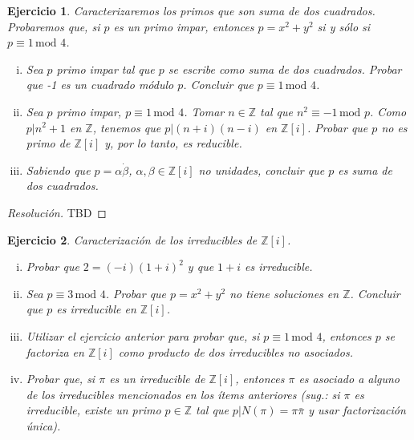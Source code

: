 \documentclass[a4paper,11pt]{article}
\newcommand{\Zm}[1]{\ensuremath{\mathbb{Z}[#1]}}
\newcommand{\Cong}[3]{\ensuremath{#1 \equiv #2 \, \textrm{mod } #3}}
\newcommand{\Div}[2]{\ensuremath{#1 | #2}}
\newtheorem*{ej}{Ejercicio}
\begin{document}
\begin{ej} 
Caracterizaremos los primos que son suma de dos cuadrados. Probaremos que, si $p$ es un
primo impar, entonces $p = x^2 + y^2$ si y sólo si $\Cong{p}{1}{4}$.

\begin{enumerate}[i.]
    \item Sea $p$ primo impar tal que $p$ se escribe como suma de dos cuadrados.
    Probar que -1 es un cuadrado módulo $p$. Concluir que $\Cong{p}{1}{4}$.

    \item Sea $p$ primo impar, $\Cong{p}{1}{4}$. Tomar $n \in \mathbb{Z}$ tal que
    $\Cong{n^2}{-1}{p}$. Como $\Div{p}{n^2 + 1}$ en $\mathbb{Z}$, tenemos que
    $\Div{p}{(n + i)(n - i)}$ en \Zm{i}. Probar que $p$ no es primo de \Zm{i} y, 
    por lo tanto, es reducible.

    \item Sabiendo que $p = \alpha \dot \beta$, $\alpha, \beta \in \Zm{i}$ no 
    unidades, concluir que $p$ es suma de dos cuadrados.
\end{enumerate}

\end{ej}

\begin{proof}[Resoluci\'on]
TBD
\end{proof}


\begin{ej} 
Caracterización de los irreducibles de \Zm{i}.

\begin{enumerate}[i.]
    \item  Probar que $2 = (-i)(1+i)^2$ y que $1+i$ es irreducible.

    \item Sea \Cong{p}{3}{4}. Probar que $p = x^2 + y^2$ no tiene soluciones
    en $\mathbb{Z}$. Concluir que $p$ es irreducible en \Zm{i}.

    \item Utilizar el ejercicio anterior para probar que, si \Cong{p}{1}{4}, entonces
    $p$ se factoriza en \Zm{i} como producto de dos irreducibles no asociados.

    \item Probar que, si $\pi$ es un irreducible de \Zm{i}, entonces $\pi$ es asociado
    a alguno de los irreducibles mencionados en los ítems anteriores (sug.: si $\pi$ es
    irreducible, existe un primo $p \in \mathbb{Z}$ tal que \Div{p}{N(\pi) = \pi \bar{\pi}}
    y usar factorización única).
\end{enumerate}
\end{ej}
\end{document}
